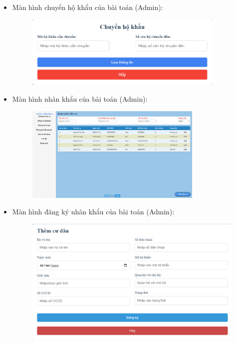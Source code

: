 \documentclass{article}
\begin{document}
\begin{itemize}
\begin{figure}[H]
    \end{figure}
    \item Màn hình chuyển hộ khẩu của bài toán (Admin):
    \begin{figure}[H]
        \centering
        \includegraphics[width=0.9\textwidth]{Ảnh chương 4/Chuyển hộ khẩu Admin.png}
    \end{figure}
    \item Màn hình nhân khẩu của bài toán (Admin):
    \begin{figure}[H]
        \centering
        \includegraphics[width=0.8\textwidth]{Ảnh chương 4/Admin dân cư.png}
    \end{figure}
    \item Màn hình đăng ký nhân khẩu của bài toán (Admin):
    \begin{figure}[H]
        \centering
        \includegraphics[width=1\textwidth]{Ảnh chương 4/Thêm cư dân admin.png}

\end{figure}
\end{itemize}
\end{document}
